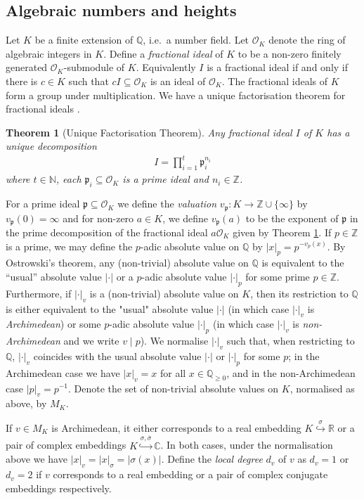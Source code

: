 \documentclass{article}\usepackage[a4paper,margin=20mm]{geometry}
\newtheorem{theorem}{Theorem}\newtheorem{lemma}[theorem]{Lemma}\newtheorem{proposition}[theorem]{Proposition}\newtheorem{corollary}[theorem]{Corollary}\newtheorem{definition}[theorem]{Definition}\newtheorem{claim}[theorem]{Claim}\newtheorem{remark}[theorem]{Remark}\newtheorem{observation}[theorem]{Observation}\newtheorem{conjecture}[theorem]{Conjecture}\newtheorem{example}[theorem]{Example}
\newcommand{\Q}{\mathbb{Q}}
\newcommand{\p}{\mathfrak{p}}
\newcommand{\Z}{\mathbb{Z}}
\newcommand{\N}{\mathbb{N}}
\renewcommand{\O}{\mathcal{O}}
\begin{document}
\subsection{Algebraic numbers and heights}
 Let $K$ be a finite extension of $\Q$, i.e.\ a number field. Let $\O_K$ denote the ring of algebraic integers in $K$. Define a \emph{fractional ideal} of $K$ to be a non-zero finitely generated $\O_K$-submodule of $K$. Equivalently $I$ is a fractional ideal if and only if there is $c \in K$ such that $cI \subseteq \O_K$ is an ideal of $\O_K$. The fractional ideals of $K$ form a group under multiplication. We have a unique factorisation theorem for fractional ideals \cite[p. 22]{neukirch_algebraic_1999}.
 \begin{theorem}[Unique Factorisation Theorem] \label{thm:ideal_fac}
Any fractional ideal $I$ of $K$ has a unique decomposition
\begin{align*}
I = \prod_{i=1}^t \p_i^{n_i}
\end{align*}
where $t \in \N$, each $\p_i \subseteq \O_K$ is a prime ideal and $n_i \in \Z$. 
 \end{theorem}

 For a prime ideal $\p \subseteq \O_K$ we define the \emph{valuation} $v_\p : K \to \Z \cup \{\infty\}$ by $v_\p(0) = \infty$ and for non-zero $a \in K$, we define $v_\p(a)$ to be the exponent of $\p$ in the prime decomposition of the fractional ideal $a\O_K$ given by Theorem \ref{thm:ideal_fac}. If $p \in \mathbb Z$ is a prime, we may define the $p$-adic absolute value on $\mathbb Q$ by $|x|_p = p^{-v_p(x)}$. By Ostrowski's theorem, any (non-trivial) absolute value on $\Q$ is equivalent to the ``usual'' absolute value $|\cdot|$ or a $p$-adic absolute value $|\cdot|_p$ for some prime $p \in \Z$. Furthermore, if $|\cdot|_v$ is a (non-trivial) absolute value on $K$, then its restriction to $\Q$ is either equivalent to the "usual" absolute value $|\cdot|$ (in which case $|\cdot|_v$ is \emph{Archimedean}) or some $p$-adic absolute value $|\cdot|_p$ (in which case $|\cdot|_v$ is \emph{non-Archimedean} and we write $v \mid p$). We normalise $|\cdot|_v$ such that, when restricting to $\Q$, $|\cdot|_v$ coincides with the usual absolute value $|\cdot|$ or $|\cdot|_p$ for some $p$; in the Archimedean case we have $|x|_v = x$ for all $x \in \Q_{\geq 0}$, and in the non-Archimedean case $|p|_v = p^{-1}$. Denote the set of non-trivial absolute values on $K$, normalised as above, by $M_K$.

If $v \in M_K$ is Archimedean, it either corresponds to a real embedding $K \overset{\sigma}\hookrightarrow \mathbb R$ or a pair of complex embeddings $K \overset{\sigma,\overline \sigma}\hookrightarrow \mathbb C$. In both cases, under the normalisation above we have $|x|_v = |x|_\sigma = |\sigma(x)|$. Define the \emph{local degree} $d_v$ of $v$ as $d_v = 1$ or $d_v = 2$ if $v$ corresponds to a real embedding or a pair of complex conjugate embeddings respectively.
\end{document}
